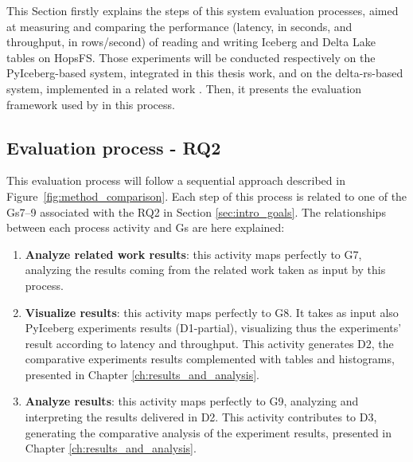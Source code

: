 This Section firstly explains the steps of this system evaluation processes, aimed at measuring and comparing the performance (latency, in seconds, and throughput, in rows/second) of reading and writing Iceberg and Delta Lake tables on \gls{HopsFS}. Those experiments will be conducted respectively on the PyIceberg-based system, integrated in this thesis work, and on the delta-rs-based system, implemented in a related work \cite{manfrediReducingReadWrite2024}. Then, it presents the evaluation framework used by in this process.



\subsection{Evaluation process - RQ2}
\label{subsec:eval_process_iceberg_delta}
This evaluation process will follow a sequential approach described in Figure~\ref{fig:method_comparison}. Each step of this process is related to one of the \glspl{G}7--9 associated with the \gls{RQ}2 in Section \ref{sec:intro_goals}. The relationships between each process activity and \glspl{G} are here explained:
\begin{enumerate}
    \item \textbf{Analyze related work results}: this activity maps perfectly to \gls{G}7, analyzing the results coming from the related work taken as input by this process.
    \item \textbf{Visualize results}: this activity maps perfectly to \gls{G}8. It takes as input also PyIceberg experiments results (\gls{D}1-partial), visualizing thus the experiments' result according to latency and throughput. This activity generates \gls{D}2, the comparative experiments results complemented with tables and histograms, presented in Chapter \ref{ch:results_and_analysis}.
    \item \textbf{Analyze results}: this activity maps perfectly to \gls{G}9, analyzing and interpreting the results delivered in \gls{D}2. This activity contributes to \gls{D}3, generating the comparative analysis of the experiment results, presented in Chapter \ref{ch:results_and_analysis}.
\end{enumerate}
